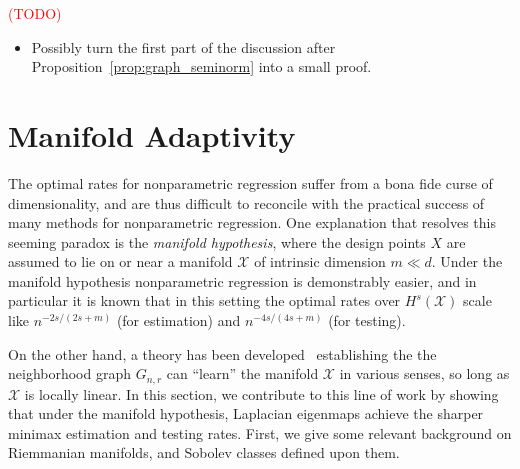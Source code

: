 \documentclass{article}
\newcommand{\1}{\mathbf{1}}
\newcommand{\Xset}{\mathcal{X}}
\newcommand{\mc}[1]{\mathcal{#1}}
\theoremstyle{alden}
\theoremstyle{aldenthm}
\theoremstyle{definition}
\theoremstyle{remark}
\begin{document}
\textcolor{red}{(TODO)}
\begin{itemize}
	\item Possibly turn the first part of the discussion after Proposition~\ref{prop:graph_seminorm} into a small proof.
\end{itemize}


\section{Manifold Adaptivity}
\label{sec:manifold_adaptivity}

The optimal rates for nonparametric regression suffer from a bona fide curse of dimensionality, and are thus difficult to reconcile with the practical success of many methods for nonparametric regression. One explanation that resolves this seeming paradox is the \emph{manifold hypothesis}, where the design points $X$ are assumed to lie on or near a manifold $\mc{X}$ of intrinsic dimension $m \ll d$. Under the manifold hypothesis nonparametric regression is demonstrably easier, and in particular it is known \citep{bickel2007,ariascastro2018} that in this setting the optimal rates over $H^s(\Xset)$ scale like $n^{-2s/(2s + m)}$ (for estimation) and $n^{-4s/(4s + m)}$ (for testing). 

On the other hand, a theory has been developed~\citep{belkin03,belkin05,niyogi2013} establishing the the neighborhood graph $G_{n,r}$ can ``learn'' the manifold $\Xset$ in various senses, so long as $\Xset$ is locally linear. In this section, we contribute to this line of work by showing that under the manifold hypothesis, Laplacian eigenmaps achieve the sharper minimax estimation and testing rates. First, we give some relevant background on Riemmanian manifolds, and Sobolev classes defined upon them.
\end{document}
